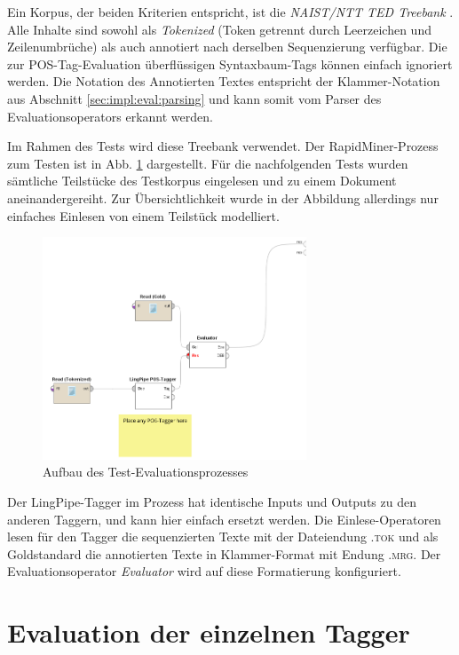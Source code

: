 Ein Korpus, der beiden Kriterien entspricht, ist die \textit{NAIST/NTT TED Treebank} \cite{tedbank}. Alle Inhalte sind sowohl als \textit{Tokenized} (Token getrennt durch Leerzeichen und Zeilenumbrüche) als auch annotiert nach derselben Sequenzierung verfügbar. Die zur POS-Tag-Evaluation überflüssigen Syntaxbaum-Tags können einfach ignoriert werden. Die Notation des Annotierten Textes entspricht der Klammer-Notation  aus Abschnitt \ref{sec:impl:eval:parsing} und kann somit vom Parser des Evaluationsoperators erkannt werden.

Im Rahmen des Tests wird diese Treebank verwendet. Der RapidMiner-Prozess zum Testen ist in Abb. \ref{fig:eval:corpus:process} dargestellt. Für die nachfolgenden Tests wurden sämtliche Teilstücke des Testkorpus eingelesen und zu einem Dokument aneinandergereiht. Zur Übersichtlichkeit wurde in der Abbildung allerdings nur einfaches Einlesen von einem Teilstück modelliert. 

\begin{figure}[htb]
	\centering
	\captionsetup{justification=centering,margin=2cm}
	\includegraphics[width=0.7\textwidth]{gfx/process.png}
	
	\caption{Aufbau des Test-Evaluationsprozesses} 
	\label{fig:eval:corpus:process}
\end{figure}

Der LingPipe-Tagger im Prozess hat identische Inputs und Outputs zu den anderen Taggern, und kann hier einfach ersetzt werden. Die Einlese-Operatoren lesen für den Tagger die sequenzierten Texte mit der Dateiendung \textsc{.tok} und als Goldstandard die annotierten Texte in Klammer-Format mit Endung \textsc{.mrg}. Der Evaluationsoperator \textit{Evaluator} wird auf diese Formatierung konfiguriert.

\section{Evaluation der einzelnen Tagger}
\label{sec:eval:detail}

